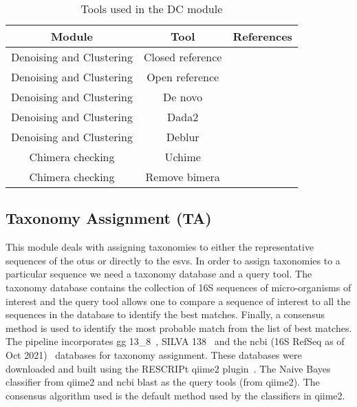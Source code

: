   \begin{table}[h]
    \centering
    \small
    \begin{tabular}{|c|c|c|}
      \hline
      \textbf{Module} & \textbf{Tool} & \textbf{References} \\
      \hline
      Denoising and Clustering & Closed reference & \cite{rognesVSEARCHVersatileOpen2016,bolyenReproducibleInteractiveScalable2019} \\
      Denoising and Clustering & Open reference & \cite{rognesVSEARCHVersatileOpen2016,bolyenReproducibleInteractiveScalable2019} \\
      Denoising and Clustering & De novo & \cite{rognesVSEARCHVersatileOpen2016,bolyenReproducibleInteractiveScalable2019} \\
      Denoising and Clustering & Dada2 & \cite{Callahan2016} \\
      Denoising and Clustering & Deblur & \cite{Amir2017,bolyenReproducibleInteractiveScalable2019} \\
      \hline
      Chimera checking & Uchime & \cite{rognesVSEARCHVersatileOpen2016,bolyenReproducibleInteractiveScalable2019} \\
      Chimera checking & Remove bimera & \cite{Callahan2016} \\
    \end{tabular}
    \caption{Tools used in the DC module}
    \label{tab:dc_tools}
  \end{table}

  \subsection*{Taxonomy Assignment (TA)}
  \vspace{-5mm}
  This module deals with assigning taxonomies to either the representative sequences of the \ac{otu}s or directly to the \ac{esv}s.
  In order to assign taxonomies to a particular sequence we need a taxonomy database and a query tool.
  The taxonomy database contains the collection of 16S sequences of micro-organisms of interest and the query tool allows one to compare a sequence of interest to all the sequences in the database to identify the best matches.
  Finally, a consensus method is used to identify the most probable match from the list of best matches.
  The pipeline incorporates \ac{gg} 13\_8~\cite{DeSantis2006}, SILVA 138~\cite{Quast2012} and the \ac{ncbi} (16S RefSeq as of Oct 2021)~\cite{Sayers2009} databases for taxonomy assignment.
  These databases were downloaded and built using the RESCRIPt qiime2 plugin~\cite{iiRESCRIPtReproducibleSequence2021}.
  The Naive Bayes classifier from \ac{qiime2} and \ac{ncbi} blast as the query tools (from \ac{qiime2}).
  The consensus algorithm used is the default method used by the classifiers in \ac{qiime2}.

